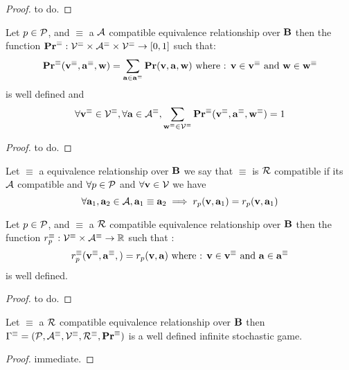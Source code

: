 \begin{proof}
	to do.
\end{proof}


\begin{myprop}
	Let $p \in \mathcal{P}$, and $\equiv$ a $\mathcal{A}$ compatible equivalence relationship over $\text{\bf B}$
	then the function $\mathbf{Pr}^\equiv : \mathcal{V}^\equiv \times \mathcal{A}^\equiv \times \mathcal{V}^\equiv \rightarrow [0,1]$ such that: 
	$$\mathbf{Pr}^\equiv(\mathbf{v}^\equiv,\mathbf{a}^\equiv,\mathbf{w}) = \sum_{\mathbf{a} \in \mathbf{a}^\equiv}\mathbf{Pr}(\mathbf{v},\mathbf{a},\mathbf{w}) \mbox{ where : } \mathbf{v}\in \mathbf{v}^\equiv \mbox{ and } \mathbf{w} \in \mathbf{w}^\equiv$$ 
	is well defined and 
	$$\forall \mathbf{v}^\equiv \in \mathcal{V}^\equiv,\forall \mathbf{a} \in \mathcal{A}^\equiv, \sum_{\mathbf{w} ^\equiv \in \mathcal{V}^\equiv} \mathbf{Pr}^\equiv(\mathbf{v}^\equiv, \mathbf{a}^\equiv, \mathbf{w}^\equiv)  =  1 $$
\end{myprop}
\begin{proof}
	to do.
\end{proof}

\begin{mydef}
	Let $\equiv$ a equivalence relationship over $\text{\bf B}$ we say that $\equiv$ is $\mathcal{R}$ compatible if its $\mathcal{A}$ compatible and $\forall p \in \mathcal{P}$ and $\forall \mathbf{v} \in \mathcal{V}$ we have 
	$$\forall \mathbf{a}_1,\mathbf{a}_2 \in \mathcal{A}, \mathbf{a}_1 \equiv \mathbf{a}_2 \implies r_p(\mathbf{v},\mathbf{a}_1) = r_p(\mathbf{v},\mathbf{a}_1)$$
\end{mydef}

\begin{myprop}
	Let $p \in \mathcal{P}$, and $\equiv$ a $\mathcal{R}$ compatible equivalence relationship over $\text{\bf B}$ then the function $r_p^\equiv : \mathcal{V}^\equiv \times \mathcal{A}^\equiv \rightarrow \mathbb{R}$ such that :
	$$r_p^\equiv(\mathbf{v}^\equiv,\mathbf{a}^\equiv,) = r_p(\mathbf{v},\mathbf{a}) \mbox{ where : } \mathbf{v}\in \mathbf{v}^\equiv \mbox{ and } \mathbf{a} \in \mathbf{a}^\equiv $$
	is well defined.
\end{myprop}
\begin{proof}
	to do.
\end{proof}

\begin{myprop}
	Let $\equiv$ a $\mathcal{R}$ compatible equivalence relationship over $\text{\bf B}$ then $\Gamma^\equiv = (\mathcal{P},\mathcal{A}^\equiv,\mathcal{V}^\equiv,\mathcal{R}^\equiv,\mathbf{Pr}^\equiv)$ is a well defined infinite stochastic game.
\end{myprop}

\begin{proof}
	immediate.
\end{proof}

